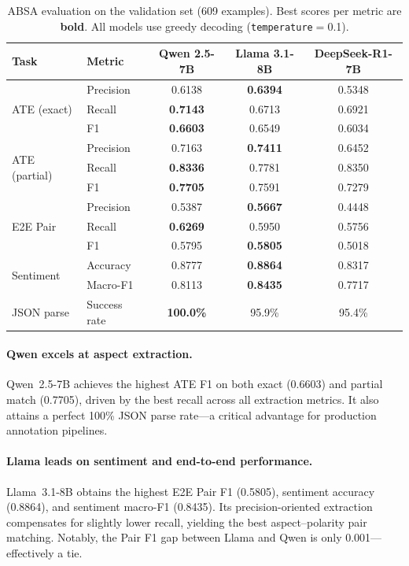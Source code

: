 \documentclass[runningheads]{llncs}
\begin{document}
\begin{table}[t]
\centering
\caption{ABSA evaluation on the validation set (609 examples). Best scores per metric are \textbf{bold}. All models use greedy decoding (\texttt{temperature}$=$0.1).}
\label{tab:absa_results}
\setlength{\tabcolsep}{3.5pt}
\begin{tabular}{llccc}
\toprule
\textbf{Task} & \textbf{Metric} & \textbf{Qwen 2.5-7B} & \textbf{Llama 3.1-8B} & \textbf{DeepSeek-R1-7B} \\
\midrule
\multirow{3}{*}{ATE (exact)}
  & Precision & 0.6138 & \textbf{0.6394} & 0.5348 \\
  & Recall    & \textbf{0.7143} & 0.6713 & 0.6921 \\
  & F1        & \textbf{0.6603} & 0.6549 & 0.6034 \\
\midrule
\multirow{3}{*}{ATE (partial)}
  & Precision & 0.7163 & \textbf{0.7411} & 0.6452 \\
  & Recall    & \textbf{0.8336} & 0.7781 & 0.8350 \\
  & F1        & \textbf{0.7705} & 0.7591 & 0.7279 \\
\midrule
\multirow{3}{*}{E2E Pair}
  & Precision & 0.5387 & \textbf{0.5667} & 0.4448 \\
  & Recall    & \textbf{0.6269} & 0.5950 & 0.5756 \\
  & F1        & 0.5795 & \textbf{0.5805} & 0.5018 \\
\midrule
\multirow{2}{*}{Sentiment}
  & Accuracy  & 0.8777 & \textbf{0.8864} & 0.8317 \\
  & Macro-F1  & 0.8113 & \textbf{0.8435} & 0.7717 \\
\midrule
JSON parse & Success rate & \textbf{100.0\%} & 95.9\% & 95.4\% \\
\bottomrule
\end{tabular}
\end{table}

\paragraph{Qwen excels at aspect extraction.} Qwen~2.5-7B achieves the highest ATE F1 on both exact (0.6603) and partial match (0.7705), driven by the best recall across all extraction metrics. It also attains a perfect 100\% JSON parse rate---a critical advantage for production annotation pipelines.

\paragraph{Llama leads on sentiment and end-to-end performance.} Llama~3.1-8B obtains the highest E2E Pair F1 (0.5805), sentiment accuracy (0.8864), and sentiment macro-F1 (0.8435). Its precision-oriented extraction compensates for slightly lower recall, yielding the best aspect--polarity pair matching. Notably, the Pair F1 gap between Llama and Qwen is only 0.001---effectively a tie.
\end{document}
